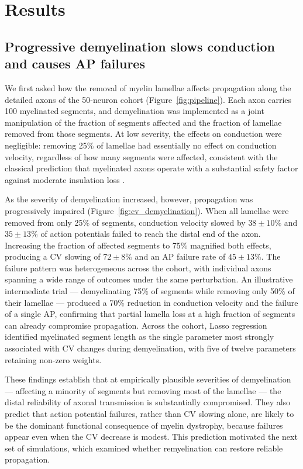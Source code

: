 \documentclass[11pt]{article}
\begin{document}
\section{Results}

\subsection{Progressive demyelination slows conduction and causes AP failures}

We first asked how the removal of myelin lamellae affects propagation along the detailed axons of the 50-neuron cohort (Figure~\ref{fig:pipeline}). Each axon carries 100 myelinated segments, and demyelination was implemented as a joint manipulation of the fraction of segments affected and the fraction of lamellae removed from those segments. At low severity, the effects on conduction were negligible: removing 25\% of lamellae had essentially no effect on conduction velocity, regardless of how many segments were affected, consistent with the classical prediction that myelinated axons operate with a substantial safety factor against moderate insulation loss \citep{waxman1980determinants,devaux2008tight}.

As the severity of demyelination increased, however, propagation was progressively impaired (Figure~\ref{fig:cv_demyelination}). When all lamellae were removed from only 25\% of segments, conduction velocity slowed by $38 \pm 10\%$ and $35 \pm 13\%$ of action potentials failed to reach the distal end of the axon. Increasing the fraction of affected segments to 75\% magnified both effects, producing a CV slowing of $72 \pm 8\%$ and an AP failure rate of $45 \pm 13\%$. The failure pattern was heterogeneous across the cohort, with individual axons spanning a wide range of outcomes under the same perturbation. An illustrative intermediate trial --- demyelinating 75\% of segments while removing only 50\% of their lamellae --- produced a 70\% reduction in conduction velocity and the failure of a single AP, confirming that partial lamella loss at a high fraction of segments can already compromise propagation. Across the cohort, Lasso regression identified myelinated segment length as the single parameter most strongly associated with CV changes during demyelination, with five of twelve parameters retaining non-zero weights.

These findings establish that at empirically plausible severities of demyelination --- affecting a minority of segments but removing most of the lamellae --- the distal reliability of axonal transmission is substantially compromised. They also predict that action potential failures, rather than CV slowing alone, are likely to be the dominant functional consequence of myelin dystrophy, because failures appear even when the CV decrease is modest. This prediction motivated the next set of simulations, which examined whether remyelination can restore reliable propagation.
\end{document}
